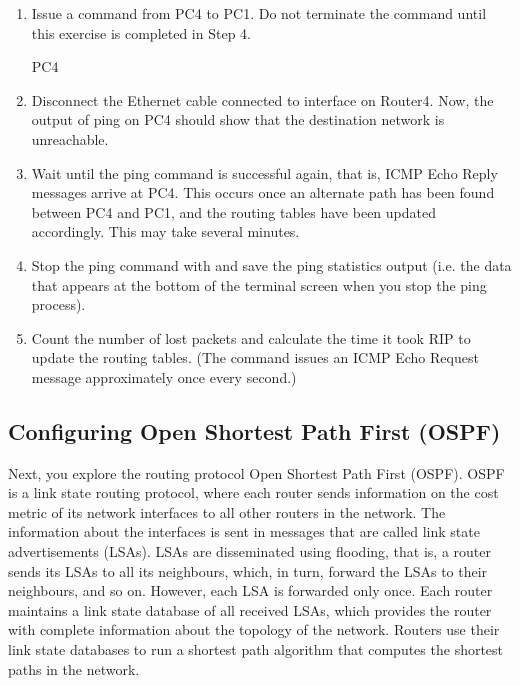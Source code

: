 \begin{enumerate}
	\item Issue a  command from PC4 to PC1. Do not terminate the  command until this exercise is completed in Step 4.
		\begin{cmdblock}
	PC4%
		\end{cmdblock}
	\item Disconnect the Ethernet cable connected to interface  on Router4. Now, the output of ping on PC4 should show that the destination network is unreachable.
	\item Wait until the ping command is successful again, that is, ICMP Echo Reply messages arrive at PC4. This occurs once an alternate path has been found between PC4 and PC1, and the routing tables have been updated accordingly. This may take several minutes.
	\item Stop the ping command with  and save the ping statistics output (i.e. the data that appears at the bottom of the terminal screen when you stop the ping process).
	\item Count the number of lost packets and calculate the time it took RIP to update the routing tables. (The  command issues an ICMP Echo Request message approximately once every second.)
\end{enumerate}

\begin{questions}
\end{questions}

\newpage
\subsection{Configuring Open Shortest Path First (OSPF)}

Next, you explore the routing protocol Open Shortest Path First (OSPF). OSPF is a link state routing protocol, where each router sends information on the cost metric of its network interfaces to all other routers in the network. The information about the interfaces is sent in messages that are called link state advertisements (LSAs). LSAs are disseminated using flooding, that is, a router sends its LSAs to all its neighbours, which, in turn, forward the LSAs to their neighbours, and so on. However, each LSA is forwarded only once. Each router maintains a link state database of all received LSAs, which provides the router with complete information about the topology of the network. Routers use their link state databases to run a shortest path algorithm that computes the shortest paths in the network.

